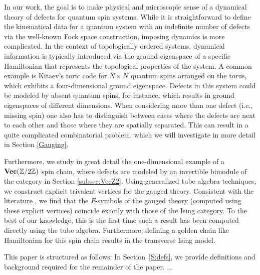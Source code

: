 In our work, the goal is to make physical and microscopic sense of a dynamical theory of defects for quantum spin systems. While it is straightforward to define the kinematical data for a quantum system with an indefinite number of defects via the well-known Fock space construction, imposing dynamics is more complicated. In the context of topologically ordered systems, dynamical information is typically introduced via the ground eigenspace of a specific Hamiltonian that represents the topological properties of the system. A common example is Kitaev's toric code for $N\times N$ quantum spins arranged on the torus, which exhibits a four-dimensional ground eigenspace. Defects in this system could be modeled by absent quantum spins, for instance, which results in ground eigenspaces of different dimensions. When considering more than one defect (i.e., missing spin) one also has to distinguish between cases where the defects are next to each other and those where they are spatially separated. This can result in a quite complicated combinatorial problem, which we will investigate in more detail in Section \ref{Gauging}.

Furthermore, we study in great detail the one-dimensional example of a $\textbf{Vec}(\mathbb{Z}/2\mathbb{Z})$ spin chain, where defects are modeled by an invertible bimodule of the category in Section \ref{subsec:VecZ2}.
Using generalized tube algebra techniques\cite{ocneanu}, we construct explicit trivalent vertices for the gauged theory. Consistent with the literature \cite{TY,ENO10,Bombin2010,BBCW14,WBV17}, we find that the $F$-symbols of the gauged theory (computed using these explicit vertices) coincide exactly with those of the Ising category. To the best of our knowledge, this is the first time such a result has been computed directly using the tube algebra. Furthermore, defining a golden chain like Hamiltonian for this spin chain results in the transverse Ising model.

This paper is structured as follows: In Section~\ref{S:defs}, we provide definitions and background required for the remainder of the paper. ...